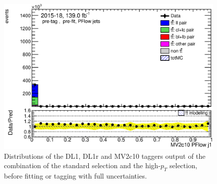 \documentclass[letterpaper,12pt]{article}
\begin{document}
\begin{figure}[H]
\begin{minipage}[b]{.45\textwidth}
	\includegraphics[width=1\textwidth]{Oct_distributions/pretagNoRwDL1rwithhighpTPFlow_scaledall/DataMC_J1_MV2c10.eps}
	\end{minipage}
	\caption{Distributions of the DL1, DL1r and MV2c10 
	taggers output of the combination 
	of the standard selection and the high-$p_T$ selection, 
	before fitting or tagging with full uncertainties.} \label{fig:taggers_PFlow}
\end{figure}
\newpage
\end{document}
